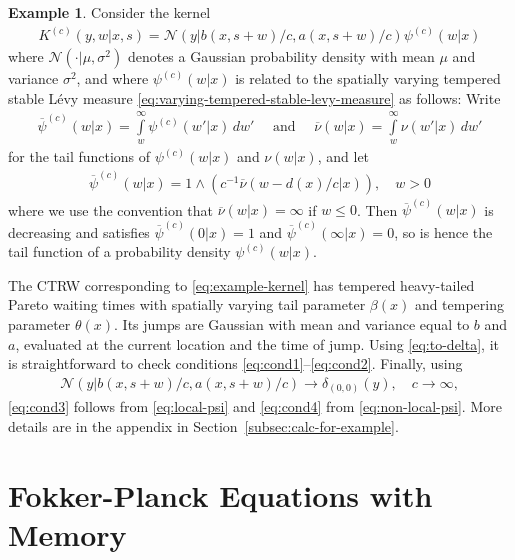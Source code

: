 \documentclass[a4paper,12pt]{article}
\numberwithin{equation}{section}
\theoremstyle{plain}
\theoremstyle{definition}
\newtheorem{example}[theorem]{Example}
\theoremstyle{remark}
\numberwithin{equation}{section}
\newcommand{\1}{\mathbf 1}
\begin{document}
\begin{example} \label{example}
Consider the kernel 
\begin{align}
\label{eq:example-kernel}
K^{(c)}(y,w|x,s) 
= \mathcal N\left(y | b(x,s+w)/c, a(x,s+w)/c\right)
\psi^{(c)}(w|x)
\end{align}
where $\mathcal N( \cdot | \mu, \sigma^2)$ denotes a Gaussian probability density with 
mean $\mu$ and variance $\sigma^2$, and where $\psi^{(c)}(w|x)$ is related to 
the spatially varying tempered stable L\'evy measure
\eqref{eq:varying-tempered-stable-levy-measure} as follows: 
Write 
\begin{align}
\overline \psi^{(c)}(w|x) = \int\limits_w^\infty \psi^{(c)}(w'|x)\,dw' 
\quad \text{ and } \quad 
\overline \nu(w|x) = \int\limits_w^\infty \nu(w'|x)\,dw'
\end{align}
for the tail functions of $\psi^{(c)}(w|x)$ and $\nu(w|x)$, and let 
\begin{align} \label{eq:def-psi}
\overline \psi^{(c)}(w|x) = 1 \wedge \left( c^{-1} \overline \nu(w-d(x)/c|x)\right), \quad w > 0
\end{align}
where we use the convention that $\overline \nu(w|x) = \infty$ if $w \le 0$. 
Then $\overline \psi^{(c)}(w|x)$ is decreasing and satisfies $\overline \psi^{(c)}(0|x) = 1$ and $\overline \psi^{(c)}(\infty|x) = 0$, so is hence the tail function of a probability density $\psi^{(c)}(w|x)$. 

The CTRW corresponding to \eqref{eq:example-kernel} has tempered heavy-tailed Pareto waiting times with spatially varying tail parameter $\beta(x)$ and tempering parameter $\theta(x)$. Its jumps are Gaussian with mean and variance equal to $b$ and $a$, evaluated at the current location and the time of jump. 
Using \eqref{eq:to-delta}, it is straightforward to check conditions \eqref{eq:cond1}--\eqref{eq:cond2}. 
Finally, using 
\begin{align}
\mathcal N\left(y | b(x,s+w)/c, a(x,s+w)/c\right) \to \delta_{(0,0)}(y), 
\quad c \to \infty,
\end{align}
\eqref{eq:cond3} follows from \eqref{eq:local-psi} and 
\eqref{eq:cond4} from \eqref{eq:non-local-psi}.
More details are in the appendix in Section~\ref{subsec:calc-for-example}.
\end{example}



\section{Fokker-Planck Equations with Memory}
\label{sec:FFPE}
\end{document}
